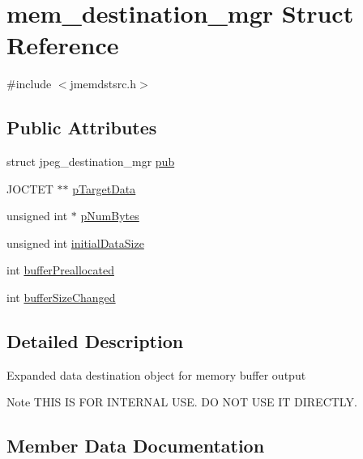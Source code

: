 \hypertarget{structmem__destination__mgr}{}\section{mem\+\_\+destination\+\_\+mgr Struct Reference}
\label{structmem__destination__mgr}


{\ttfamily \#include $<$jmemdstsrc.\+h$>$}

\subsection*{Public Attributes}
\begin{DoxyCompactItemize}
\item 
struct jpeg\+\_\+destination\+\_\+mgr \hyperlink{structmem__destination__mgr_a73dcb86bf4735b095cc33326a4cb0936}{pub}
\item 
J\+O\+C\+T\+ET $\ast$$\ast$ \hyperlink{structmem__destination__mgr_a434f03895481594ed014e2f1f8098ba3}{p\+Target\+Data}
\item 
unsigned int $\ast$ \hyperlink{structmem__destination__mgr_ae364bbfaf108e15a6588a294c35c6899}{p\+Num\+Bytes}
\item 
unsigned int \hyperlink{structmem__destination__mgr_ab41509cea9a006b780f6b73318cea0f0}{initial\+Data\+Size}
\item 
int \hyperlink{structmem__destination__mgr_a565a0b95e4c341f4af779c34eef03aa1}{buffer\+Preallocated}
\item 
int \hyperlink{structmem__destination__mgr_a6eb40fb8a424b4afa873ff8e684d40e6}{buffer\+Size\+Changed}
\end{DoxyCompactItemize}


\subsection{Detailed Description}
Expanded data destination object for memory buffer output \begin{DoxyNote}{Note}
T\+H\+IS IS F\+OR I\+N\+T\+E\+R\+N\+AL U\+SE. DO N\+OT U\+SE IT D\+I\+R\+E\+C\+T\+LY. 
\end{DoxyNote}


\subsection{Member Data Documentation}
